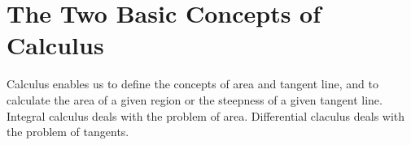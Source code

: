 \section{The Two Basic Concepts of Calculus}\label{sec:1.1.1}

\begin{note}
  Calculus enables us to define the concepts of area and tangent line, and to calculate the area of a given region or the steepness of a given tangent line.
  Integral calculus deals with the problem of area.
  Differential claculus deals with the problem of tangents.
\end{note}
